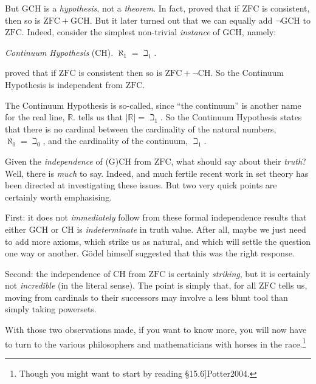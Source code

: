 \documentclass[10pt,a4paper]{article}
\makeatletter
\theoremstyle{plain}
\theoremstyle{definition}
\theoremstyle{remark}
\newcommand{\olref}{\@ifnextchar[{\olref@i}{\olref@final}}
\def\olref@i[#1]{\@ifnextchar[{\olref@ii}{\olref@final}}
\def\olref@ii[#1]{\@ifnextchar[{\olref@iii}{\olref@final}}
\def\olref@iii[#1]{\olref@final}
\def\olref@final#1{\ref{#1}}
\providecommand{\ZFC}{\mathrm{ZFC}}
\providecommand{\Real}{\mathbb{R}}
\providecommand{\card}[1]{\lvert #1 \rvert}
\providecommand{\citet}[1]{\cite{#1}}
\makeatother
\begin{document}
But GCH is a \emph{hypothesis}, not a \emph{theorem}. In fact,
\citet{Godel1938} proved that if $\ZFC$ is consistent, then so is
$\ZFC + \text{GCH}$. But it later turned out that we can equally add
$\lnot$GCH to $\ZFC$. Indeed, consider the simplest non-trivial
\emph{instance} of GCH, namely: 

\begin{defish}
\emph{Continuum Hypothesis} (CH). $\aleph_1 = \beth_1$. 
\end{defish}

\citet{Cohen1963} proved that if $\ZFC$ is consistent then so is $\ZFC
+ \lnot\text{CH}$. So the Continuum Hypothesis is independent from $\ZFC$.

The Continuum Hypothesis is so-called, since ``the continuum'' is
another name for the real line, $\Real$.
\olref[opps]{continuumis2aleph0} tells us that $\card{\Real} =
\beth_1$. So the Continuum Hypothesis states that there is no cardinal
between the cardinality of the natural numbers, $\aleph_0 = \beth_0$,
and the cardinality of the continuum, $\beth_1$.

Given the \emph{independence} of (G)CH from $\ZFC$, what should say
about their \emph{truth}? Well, there is \emph{much} to say. Indeed,
and much fertile recent work in set theory has been directed at
investigating these issues. But two very quick points are certainly worth
emphasising. 

First: it does not \emph{immediately} follow from these formal
independence results that either GCH or CH is \emph{indeterminate} in
truth value. After all, maybe we just need to add more axioms, which
strike us as natural, and which will settle the question one way or
another. G\"odel himself suggested that this was the right response. 

Second: the independence of CH from $\ZFC$ is certainly
\emph{striking}, but it is certainly not \emph{incredible} (in the
literal sense). The point is simply that, for all $\ZFC$ tells us,
moving from cardinals to their successors may involve a less blunt
tool than simply taking powersets.

With those two observations made, if you want to know more, you will
now have to turn to the various philosophers and mathematicians with
horses in the race.\footnote{Though you might want to start by reading \citet[\S15.6]{Potter2004}.}

\end{document}
